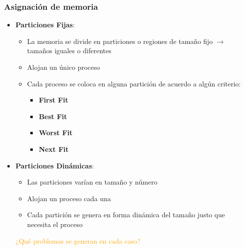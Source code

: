 \begin{frame}
  \frametitle{Asignación de memoria}
  \begin{itemize}
	  \item \textbf{Particiones Fijas}:
	  \begin{itemize}
	  	\item La memoria se divide en particiones o regiones de tamaño fijo $\rightarrow$ tamaños iguales o diferentes
	  	\item Alojan un único proceso
	  	\item Cada proceso se coloca en alguna partición de acuerdo a algún criterio:
	  	\begin{itemize}
	  		\item \textbf{First Fit}
	  		\item \textbf{Best Fit}
	  		\item \textbf{Worst Fit}
	  		\item \textbf{Next Fit}
	  	\end{itemize}
	  \end{itemize}
	  \item \textbf{Particiones Dinámicas}:
	  \begin{itemize}
	  	\item Las particiones varían en tamaño y número
	  	\item Alojan un proceso cada una
	  	\item Cada partición se genera en forma dinámica del tamaño justo que necesita el proceso
	  \end{itemize}

	  \pause
	  \hspace{35pt} \textcolor{orange}{¿Qué problemas se generan en cada caso?}
  \end{itemize}
\end{frame}

